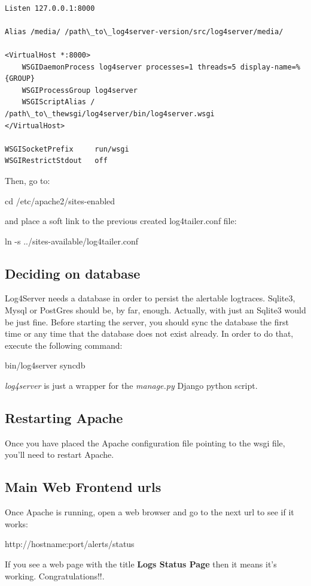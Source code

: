 \begin{config}
\begin{verbatim}

Listen 127.0.0.1:8000

Alias /media/ /path\_to\_log4server-version/src/log4server/media/

<VirtualHost *:8000>
    WSGIDaemonProcess log4server processes=1 threads=5 display-name=%{GROUP}
    WSGIProcessGroup log4server
    WSGIScriptAlias / /path\_to\_thewsgi/log4server/bin/log4server.wsgi
</VirtualHost>

WSGISocketPrefix     run/wsgi
WSGIRestrictStdout   off

\end{verbatim}
\end{config}

Then, go to:

\begin{cmd}
    cd /etc/apache2/sites-enabled
\end{cmd}
and place a soft link to the previous created log4tailer.conf file:

\begin{cmd}
    ln -s ../sites-available/log4tailer.conf
\end{cmd}

\subsection{Deciding on database}

Log4Server needs a database in order to persist the alertable logtraces. 
Sqlite3, Mysql or PostGres should be, by far, enough. Actually, with just an
Sqlite3 would be just fine. Before starting the server, you should
sync the database the first time or any time that the database does not exist
already. In order to do that, execute the following command:

\begin{cmd}
   bin/log4server syncdb 
\end{cmd}
\emph{log4server} is just a wrapper for the \emph{manage.py} Django python
script. 

\subsection{Restarting Apache}
Once you have placed the Apache configuration file pointing to the wsgi file, 
you'll need to restart Apache. 

\subsection{Main Web Frontend urls}
Once Apache is running, open a web browser and go to the next url to see if it
works:

\begin{codeexample}
http://hostname:port/alerts/status
\end{codeexample}

If you see a web page with the title \textbf{Logs Status Page} then it means
it's working. Congratulations!!. 


\newpage
